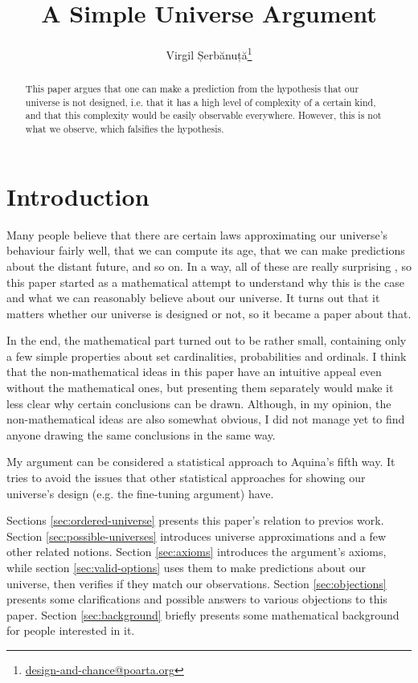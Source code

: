 \documentclass[a4paper
,draft
]{article}
\title{A Simple Universe Argument}
\author{Virgil Șerbănuță\thanks{\href{mailto:design-and-chance@poarta.org}{design-and-chance@poarta.org}}}
\newcommand{\svn}[2][]{\todo[author=Virgil,color=red!25!white,#1]{#2}}
\newcommand{\paper}[1]{paper}
\begin{document}
\maketitle

 \begin{abstract}
  This \paper{} argues that one can make a prediction from
  the hypothesis that our universe is not designed, i.e. that it has a high
  level of complexity of a certain kind, and that this complexity would be
  easily observable everywhere. However, this is not what we observe, which
  falsifies the hypothesis.
\end{abstract}

\section{Introduction}

Many people believe
that there are certain laws approximating our universe's behaviour fairly well,
that we can compute its age,
that we can make predictions about the distant future, and so on.
In a way, all of these are really surprising
\svn{Maybe move the Feinmann quote from below to here},
so this \paper{} started as a
mathematical attempt to understand why this is the case
and what we can reasonably believe about our universe.
It turns out that it matters
whether our universe is designed or not, so it became a \paper{} about that.

In the end, the mathematical part turned out to be rather small,
containing only a few simple properties about set cardinalities,
probabilities and ordinals.
I think that the non-mathematical ideas in this paper
have an intuitive appeal even without the mathematical ones,
but presenting them separately would make it less clear why certain
conclusions can be drawn.
Although, in my opinion, the non-mathematical ideas are also somewhat obvious,
I did not manage yet to find anyone drawing the same conclusions
in the same way.

My argument can be considered a statistical approach to Aquina's fifth way.
It tries to avoid the issues that other statistical approaches for showing
our universe's design (e.g. the fine-tuning argument) have.

Sections \ref{sec:ordered-universe} presents this paper's relation to
previos work.
Section \ref{sec:possible-universes} introduces universe approximations
and a few other related notions.
Section \ref{sec:axioms} introduces the argument's axioms,
while section \ref{sec:valid-options} uses them to make predictions
about our universe, then verifies if they match our observations.
Section \ref{sec:objections} presents some clarifications and possible
answers to various objections to this paper.
Section \ref{sec:background}
briefly presents some mathematical background for people interested in it.
\end{document}

